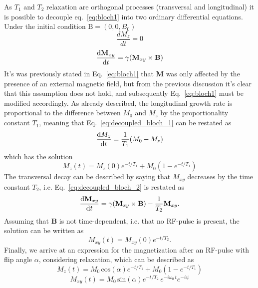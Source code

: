 As $T_1$ and $T_2$ relaxation are orthogonal processes (transversal and longitudinal) it is possible to decouple eq.~\ref{eq:bloch1} into two ordinary differential equations. Under the initial condition $\textrm{B} = (0,0,B_0)$ 
\begin{equation}
    \label{eq:decoupled_bloch_1}
    \frac{dM_z}{dt} = 0
\end{equation}
\begin{equation}
    \label{eq:decoupled_bloch_2}
    \frac{\dif\textbf{M}_{xy}}{\dif t} = \gamma ( \textbf{M}_{xy}\times \textbf{B})
\end{equation}
It's was previously stated in Eq.~\ref{eq:bloch1} that \textbf{M} was only affected by the presence of an external magnetic field, but from the previous discussion it's clear that this assumption does not hold, and subsequently Eq.~\ref{eq:bloch1} must be modified accordingly. As already described, the longitudinal growth rate is proportional to the difference between $M_0$ and $M_z$ by the proportionality constant $T_1$, meaning that Eq.~\ref{eq:decoupled_bloch_1} can be restated as
\begin{equation}
    \frac{\dif M_z}{\dif t} = \frac{1}{T_1}(M_0-M_z)
\end{equation}
which has the solution
\begin{equation}
    M_z(t) = M_z(0)e^{-t/T_1} + M_0(1-e^{-t/T_1})
\end{equation}
The transversal decay can be described by saying that $M_{xy}$ decreases by the time constant $T_2$, i.e. Eq.~\ref{eq:decoupled_bloch_2} is restated as
\begin{equation}
    \frac{\dif \textbf{M}_{xy}}{\dif t} = \gamma ( \textbf{M}_{xy}\times \textbf{B}) - \frac{1}{T_2}\textbf{M}_{xy}.
\end{equation}
Assuming that \textbf{B} is not time-dependent, i.e. that no RF-pulse is present, the solution can be written as
\begin{equation}
    M_{xy}(t) = M_{xy}(0)e^{-t/T_2}.
\end{equation}
Finally, we arrive at an expression for the magnetization after an RF-pulse with flip angle $\alpha$, considering relaxation, which can be described as
\begin{equation}
    M_z(t) = M_0\,\textrm{cos}(\alpha)e^{-t/T_1} + M_0(1-e^{-t/T_1})
\end{equation}
\begin{equation}
    M_{xy}(t) = M_0\,\textrm{sin}(\alpha)e^{-t/T_2}\,e^{-i\omega_{0}\,t}e^{-i\psi}
\end{equation}
